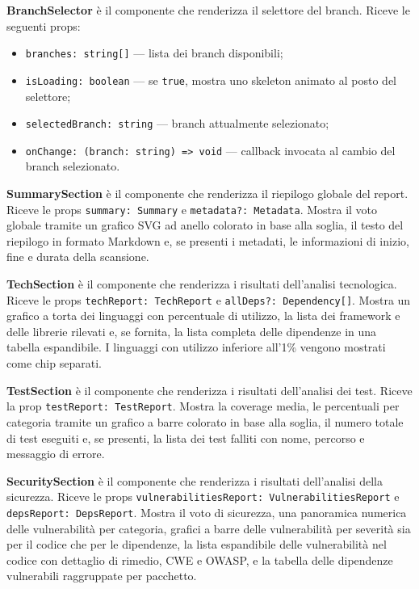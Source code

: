 \documentclass[a4paper, 11pt]{article}
\begin{document}
\textbf{BranchSelector} è il componente che renderizza il selettore del branch. Riceve le
seguenti props:
\begin{itemize}
  \item \texttt{branches: string[]} — lista dei branch disponibili;
  \item \texttt{isLoading: boolean} — se \texttt{true}, mostra uno skeleton animato al posto
        del selettore;
  \item \texttt{selectedBranch: string} — branch attualmente selezionato;
  \item \texttt{onChange: (branch: string) => void} — callback invocata al cambio del branch
        selezionato.
\end{itemize}

\textbf{SummarySection} è il componente che renderizza il riepilogo globale del report. Riceve
le props \texttt{summary: Summary} e \texttt{metadata?: Metadata}. Mostra il voto globale
tramite un grafico SVG ad anello colorato in base alla soglia, il testo del riepilogo in
formato Markdown e, se presenti i metadati, le informazioni di inizio, fine e durata della
scansione.

\textbf{TechSection} è il componente che renderizza i risultati dell'analisi tecnologica.
Riceve le props \texttt{techReport: TechReport} e \texttt{allDeps?: Dependency[]}. Mostra
un grafico a torta dei linguaggi con percentuale di utilizzo, la lista dei framework e delle
librerie rilevati e, se fornita, la lista completa delle dipendenze in una tabella espandibile.
I linguaggi con utilizzo inferiore all'1\% vengono mostrati come chip separati.

\textbf{TestSection} è il componente che renderizza i risultati dell'analisi dei test. Riceve
la prop \texttt{testReport: TestReport}. Mostra la coverage media, le percentuali per categoria
tramite un grafico a barre colorato in base alla soglia, il numero totale di test eseguiti e,
se presenti, la lista dei test falliti con nome, percorso e messaggio di errore.

\textbf{SecuritySection} è il componente che renderizza i risultati dell'analisi della
sicurezza. Riceve le props \texttt{vulnerabilitiesReport: VulnerabilitiesReport} e
\texttt{depsReport: DepsReport}. Mostra il voto di sicurezza, una panoramica numerica delle
vulnerabilità per categoria, grafici a barre delle vulnerabilità per severità sia per il codice
che per le dipendenze, la lista espandibile delle vulnerabilità nel codice con dettaglio di
rimedio, CWE e OWASP, e la tabella delle dipendenze vulnerabili raggruppate per pacchetto.
\end{document}
